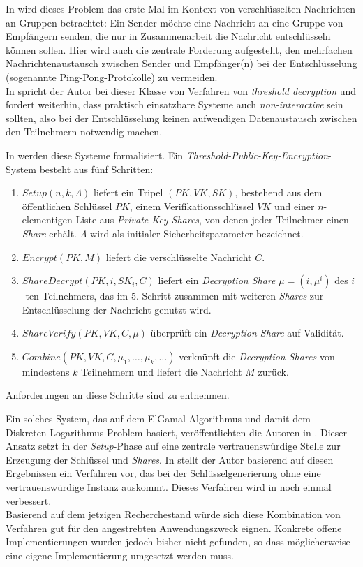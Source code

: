 In \cite{desmedt1987} wird dieses Problem das erste Mal im Kontext von verschlüsselten Nachrichten an Gruppen betrachtet: Ein Sender möchte eine Nachricht an eine Gruppe von Empfängern senden, die nur in Zusammenarbeit die Nachricht entschlüsseln können sollen. Hier wird auch die zentrale Forderung aufgestellt, den mehrfachen Nachrichtenaustausch zwischen Sender und Empfänger(n) bei der Entschlüsselung (sogenannte Ping-Pong-Protokolle) zu vermeiden. \\
In \cite{desmedt1993} spricht der Autor bei dieser Klasse von Verfahren von \textit{threshold decryption} und fordert weiterhin, dass praktisch einsatzbare Systeme auch \textit{non-interactive} sein sollten, also bei der Entschlüsselung keinen aufwendigen Datenaustausch zwischen den Teilnehmern notwendig machen.

In \cite{boneh2006} werden diese Systeme formalisiert. Ein \textit{Threshold-Public-Key-Encryption}-System besteht aus fünf Schritten: 
\begin{enumerate}
	\item \(Setup(n,k,\Lambda)\) liefert ein Tripel \((PK, VK, SK)\), bestehend aus dem öffentlichen Schlüssel \(PK\), einem Verifikationsschlüssel \(VK\) und einer \(n\)-elementigen Liste aus \textit{Private Key Shares}, von denen jeder Teilnehmer einen \textit{Share} erhält. \(\Lambda\) wird als initialer Sicherheitsparameter bezeichnet.
	\item \(Encrypt(PK, M)\) liefert die verschlüsselte Nachricht \(C\).
	\item \(ShareDecrypt(PK, i, SK_i, C)\) liefert ein \textit{Decryption Share} \(\mu=(i, \mu^i)\) des \(i\)-ten Teilnehmers, das im 5. Schritt zusammen mit weiteren \textit{Shares} zur Entschlüsselung der Nachricht genutzt wird. 
	\item \(ShareVerify(PK, VK, C, \mu)\) überprüft ein \textit{Decryption Share} auf Validität.
	\item \(Combine(PK, VK, C, {\mu_1, \dots,\mu_k, \dots})\) verknüpft die \textit{Decryption Shares} von mindestens \(k\) Teilnehmern und liefert die Nachricht \(M\) zurück.
\end{enumerate}
Anforderungen an diese Schritte sind \cite{boneh2006} zu entnehmen. 

Ein solches System, das auf dem ElGamal-Algorithmus und damit dem Diskreten-Logarithmus-Problem basiert, veröffentlichten die Autoren in \cite{DesmedtFrankel1990}.  Dieser Ansatz setzt in der \textit{Setup}-Phase auf eine zentrale vertrauenswürdige Stelle zur Erzeugung der Schlüssel und \textit{Shares}. In \cite{pedersen1991} stellt der Autor basierend auf diesen Ergebnissen ein Verfahren vor, das bei der Schlüsselgenerierung ohne eine vertrauenswürdige Instanz auskommt. Dieses Verfahren wird in \cite{gennaro1999} noch einmal verbessert.\\
Basierend auf dem jetzigen Recherchestand würde sich diese Kombination von Verfahren gut für den angestrebten Anwendungszweck eignen. Konkrete offene Implementierungen wurden jedoch bisher nicht gefunden, so dass möglicherweise eine eigene Implementierung umgesetzt werden muss.


